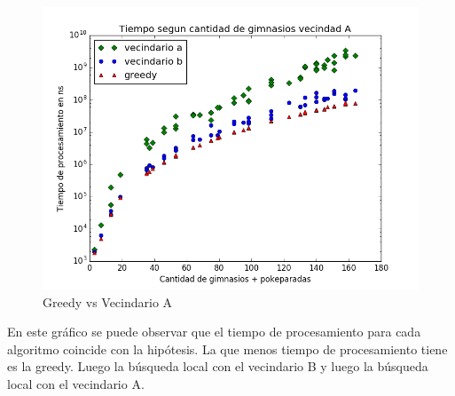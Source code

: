 \blindtext

    \begin{figure}[H]
      \begin{center}
        \includegraphics[width=0.7\columnwidth]{imagenes/Ej3/Exp3EJ3TodoTiempo.png}
        \caption{Greedy vs Vecindario A}
      \end{center}
    \end{figure}

\blindtext

En este gráfico se puede observar que el tiempo de procesamiento para cada algoritmo coincide con la hipótesis. La que menos tiempo de procesamiento tiene es la greedy. Luego la búsqueda local con el vecindario B y luego la búsqueda local con el vecindario A.